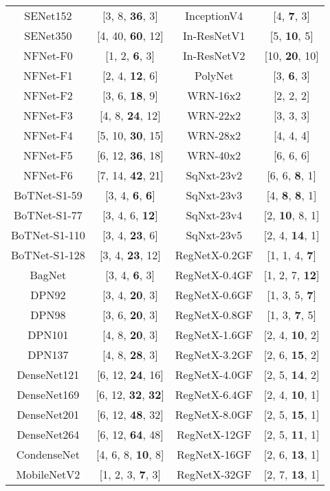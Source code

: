 \begin{table} [htbp]
{\begin{tabular}{c|c||c|c}
SENet152   &  [3, 8, {\bf 36}, 3] & InceptionV4 & [4, {\bf 7}, 3]  \\
SENet350   &  [4, 40, {\bf 60}, 12] & In-ResNetV1 & [5, {\bf 10}, 5]  \\
NFNet-F0 &  [1, 2, {\bf 6}, 3] &  In-ResNetV2 & [10, {\bf 20}, 10]  \\
NFNet-F1 &  [2, 4, {\bf 12}, 6] & PolyNet & [3, {\bf 6}, 3]   \\
NFNet-F2 &  [3, 6, {\bf 18}, 9] &  WRN-16x2 & [2, 2, 2] \\
NFNet-F3 &  [4, 8, {\bf 24}, 12] & WRN-22x2 & [3, 3, 3] \\
NFNet-F4 &  [5, 10, {\bf 30}, 15] & WRN-28x2 & [4, 4, 4] \\
NFNet-F5 &  [6, 12, {\bf 36}, 18] & WRN-40x2 & [6, 6, 6] \\
NFNet-F6 &  [7, 14, {\bf 42}, 21] & SqNxt-23v2 & [6, 6, {\bf 8}, 1]   \\ 
BoTNet-S1-59  &  [3, 4, {\bf 6}, {\bf 6}] & SqNxt-23v3 & [4, {\bf 8}, {\bf 8}, 1]\\
BoTNet-S1-77  &  [3, 4, 6, {\bf 12}] & SqNxt-23v4 & [2, {\bf 10}, 8, 1] \\
BoTNet-S1-110  &  [3, 4, {\bf 23}, 6] & SqNxt-23v5 & [2, 4, {\bf 14}, 1] \\
BoTNet-S1-128  &  [3, 4, {\bf 23}, 12] & RegNetX-0.2GF & [1, 1, 4, {\bf 7}] \\
BagNet & [3, 4, {\bf 6}, 3]   & RegNetX-0.4GF    &  [1, 2, 7, {\bf 12}] \\
DPN92 & [3, 4, {\bf 20}, 3]  & RegNetX-0.6GF  & [1, 3, 5, {\bf 7}]   \\
DPN98 & [3, 6, {\bf 20}, 3] & RegNetX-0.8GF    & [1, 3, {\bf 7}, 5]   \\
DPN101 & [4, 8, {\bf 20}, 3] & RegNetX-1.6GF  &  [2, 4, {\bf 10}, 2]  \\
DPN137 & [4, 8, {\bf 28}, 3] &   RegNetX-3.2GF    &  [2, 6, {\bf 15}, 2]  \\
DenseNet121  & [6, 12, {\bf 24}, 16]  & RegNetX-4.0GF & [2, 5, {\bf 14}, 2] \\ 
DenseNet169  &  [6, 12, {\bf 32}, {\bf 32}]  & RegNetX-6.4GF & [2, 4, {\bf 10}, 1]\\ 
DenseNet201  &  [6, 12, {\bf 48}, 32]  & RegNetX-8.0GF  & [2, 5, {\bf 15}, 1]   \\
DenseNet264  &  [6, 12, {\bf 64}, 48] &  RegNetX-12GF  & [2, 5, {\bf 11}, 1]   \\
CondenseNet  & [4, 6, 8, {\bf 10}, 8] & RegNetX-16GF  & [2, 6, {\bf 13}, 1]    \\
MobileNetV2  & [1, 2, 3, {\bf 7}, 3]  &  RegNetX-32GF  &  [2, 7, {\bf 13}, 1]   \\ 
\bottomrule
\end{tabular} }
\end{table}
 
  

 


